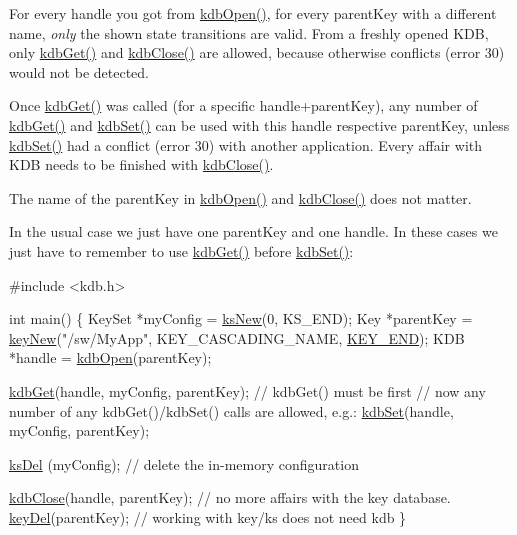 For every handle you got from \hyperlink{group__kdb_ga6808defe5870f328dd17910aacbdc6ca}{kdb\+Open()}, for every parent\+Key with a different name, {\itshape only} the shown state transitions are valid. From a freshly opened K\+D\+B, only \hyperlink{group__kdb_ga28e385fd9cb7ccfe0b2f1ed2f62453a1}{kdb\+Get()} and \hyperlink{group__kdb_gadb54dc9fda17ee07deb9444df745c96f}{kdb\+Close()} are allowed, because otherwise conflicts (error 30) would not be detected.

Once \hyperlink{group__kdb_ga28e385fd9cb7ccfe0b2f1ed2f62453a1}{kdb\+Get()} was called (for a specific handle+parent\+Key), any number of \hyperlink{group__kdb_ga28e385fd9cb7ccfe0b2f1ed2f62453a1}{kdb\+Get()} and \hyperlink{group__kdb_ga11436b058408f83d303ca5e996832bcf}{kdb\+Set()} can be used with this handle respective parent\+Key, unless \hyperlink{group__kdb_ga11436b058408f83d303ca5e996832bcf}{kdb\+Set()} had a conflict (error 30) with another application. Every affair with K\+D\+B needs to be finished with \hyperlink{group__kdb_gadb54dc9fda17ee07deb9444df745c96f}{kdb\+Close()}.

The name of the parent\+Key in \hyperlink{group__kdb_ga6808defe5870f328dd17910aacbdc6ca}{kdb\+Open()} and \hyperlink{group__kdb_gadb54dc9fda17ee07deb9444df745c96f}{kdb\+Close()} does not matter.

In the usual case we just have one parent\+Key and one handle. In these cases we just have to remember to use \hyperlink{group__kdb_ga28e385fd9cb7ccfe0b2f1ed2f62453a1}{kdb\+Get()} before \hyperlink{group__kdb_ga11436b058408f83d303ca5e996832bcf}{kdb\+Set()}\+:


\begin{DoxyCodeInclude}
\textcolor{preprocessor}{#include <kdb.h>}

\textcolor{keywordtype}{int} main()
\{
        KeySet *myConfig = \hyperlink{group__keyset_ga671e1aaee3ae9dc13b4834a4ddbd2c3c}{ksNew}(0, KS\_END);
        Key *parentKey = \hyperlink{group__key_gad23c65b44bf48d773759e1f9a4d43b89}{keyNew}(\textcolor{stringliteral}{"/sw/MyApp"}, KEY\_CASCADING\_NAME, \hyperlink{group__key_gga91fb3178848bd682000958089abbaf40aa8adb6fcb92dec58fb19410eacfdd403}{KEY\_END});
        KDB *handle = \hyperlink{group__kdb_ga6808defe5870f328dd17910aacbdc6ca}{kdbOpen}(parentKey);

        \hyperlink{group__kdb_ga28e385fd9cb7ccfe0b2f1ed2f62453a1}{kdbGet}(handle, myConfig, parentKey); \textcolor{comment}{// kdbGet() must be first}
        \textcolor{comment}{// now any number of any kdbGet()/kdbSet() calls are allowed, e.g.:}
        \hyperlink{group__kdb_ga11436b058408f83d303ca5e996832bcf}{kdbSet}(handle, myConfig, parentKey);

        \hyperlink{group__keyset_ga27e5c16473b02a422238c8d970db7ac8}{ksDel} (myConfig); \textcolor{comment}{// delete the in-memory configuration}

        \hyperlink{group__kdb_gadb54dc9fda17ee07deb9444df745c96f}{kdbClose}(handle, parentKey); \textcolor{comment}{// no more affairs with the key database.}
        \hyperlink{group__key_ga3df95bbc2494e3e6703ece5639be5bb1}{keyDel}(parentKey); \textcolor{comment}{// working with key/ks does not need kdb}
\}
\end{DoxyCodeInclude}


